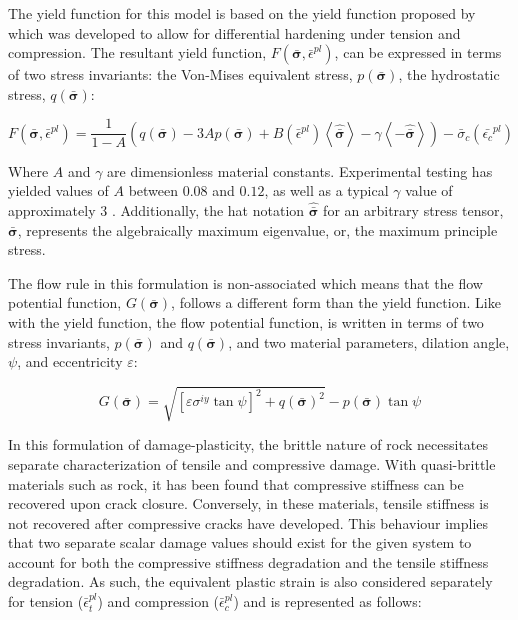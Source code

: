 The yield function for this model is based on the yield function proposed by \citet{lee_plastic-damage_1998} which was developed to allow for differential hardening under tension and compression. The resultant yield function, $F\left(\bar{\boldsymbol{\sigma}},\bar{\epsilon}^{pl}\right)$, can be expressed in terms of two stress invariants: the Von-Mises equivalent stress, $p\left(\bar{\boldsymbol{\sigma}}\right)$, the hydrostatic stress, $q\left(\bar{\boldsymbol{\sigma}}\right)$:

\begin{equation}
    F  \left(\bar{\boldsymbol{\sigma}},\bar{\epsilon}^{pl}\right) =\frac{1}{1-A}
    \left( q\left(\bar{\boldsymbol{\sigma}}\right)-3A p\left(\bar{\boldsymbol{\sigma}}\right)+B\left(\bar{\epsilon}^{pl}\right)
        \left\langle\hat{\bar{\boldsymbol{\sigma}}}\right\rangle-\gamma\left\langle-\hat{\bar{\boldsymbol{\sigma}}}\right\rangle\right)
    -\bar{\sigma}_{c} \left(\bar{\epsilon_{c}}^{pl}\right)
\label{eqn:const10c}
\end{equation}

Where $A$ and $\gamma$ are dimensionless material constants. Experimental testing has yielded values of $A$ between $0.08$ and $0.12$, as well as a typical $\gamma$ value of approximately $3$ \cite{lubliner_plastic-damage_1989}. Additionally, the hat notation $\hat{\bar{\boldsymbol{\sigma}}}$ for an arbitrary stress tensor, $\bar{\boldsymbol{\sigma}}$, represents the algebraically maximum eigenvalue, or, the maximum principle stress.

The flow rule in this formulation is non-associated which means that the flow potential function, $G\left(\bar{\boldsymbol{\sigma}}\right)$, follows a different form than the yield function. Like with the yield function, the flow potential function, is written in terms of two stress invariants, $p\left(\bar{\boldsymbol{\sigma}}\right)$ and $q\left(\bar{\boldsymbol{\sigma}}\right)$, and two material parameters, dilation angle, $\psi$, and eccentricity $\varepsilon$:

\begin{equation}
G\left(\bar{\boldsymbol{\sigma}}\right)=\sqrt{\left[\varepsilon\sigma^{iy}\tan\psi\right]^{2}+q\left(\bar{\boldsymbol{\sigma}}\right)^{2}}-p\left(\bar{\boldsymbol{\sigma}}\right)\tan\psi\label{eqn:const11c}
\end{equation}

In this formulation of damage-plasticity, the brittle nature of rock necessitates separate characterization of tensile and compressive damage. With quasi-brittle materials such as rock, it has been found that compressive stiffness can be recovered upon crack closure. Conversely, in these materials, tensile stiffness is not recovered after compressive cracks have developed. This behaviour implies that two separate scalar damage values should exist for the given system to account for both the compressive stiffness degradation and the tensile stiffness degradation. As such, the equivalent plastic strain is also considered separately for tension ($\bar{\epsilon}_{t}^{pl}$) and compression ($\bar{\epsilon}_{c}^{pl}$) and is represented as follows: 

